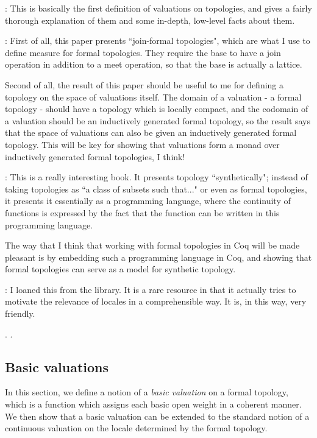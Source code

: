 \documentclass{article}           %
\begin{document}
\cite{jones1990}: This is basically the first definition of valuations on topologies, and gives a fairly thorough explanation of them and some in-depth, low-level facts about them.

\cite{maietti2005}: First of all, this paper presents ``join-formal topologies", which are what I use to define measure for formal topologies. They require the base to have a join operation in addition to a meet operation, so that the base is actually a lattice.

Second of all, the result of this paper should be useful to me for defining a topology on the space of valuations itself. The domain of a valuation - a formal topology - should have a topology which is locally compact, and the codomain of a valuation should be an inductively generated formal topology, so the result says that the space of valuations can also be given an inductively generated formal topology. This will be key for showing that valuations form a monad over inductively generated formal topologies, I think!

\cite{escardo2004}: This is a really interesting book. It presents topology ``synthetically"; instead of taking topologies as ``a class of subsets such that..." or even as formal topologies, it presents it essentially as a programming language, where the continuity of functions is expressed by the fact that the function can be written in this programming language.

The way that I think that working with formal topologies in Coq will be made pleasant is by embedding such a programming language in Coq, and showing that formal topologies can serve as a model for synthetic topology.

\cite{vickers1989}: I loaned this from the library. It is a rare resource in that it actually tries to motivate the relevance of locales in a comprehensible way. It is, in this way, very friendly.

\cite{coquand2003}. \cite{sambin2000}.

\subsection{Basic valuations}

In this section, we define a notion of a \emph{basic valuation} on a formal topology, which is a function which assigns each basic open weight in a coherent manner. We then show that a basic valuation can be extended to the standard notion of a continuous valuation on the locale determined by the formal topology.
\end{document}
